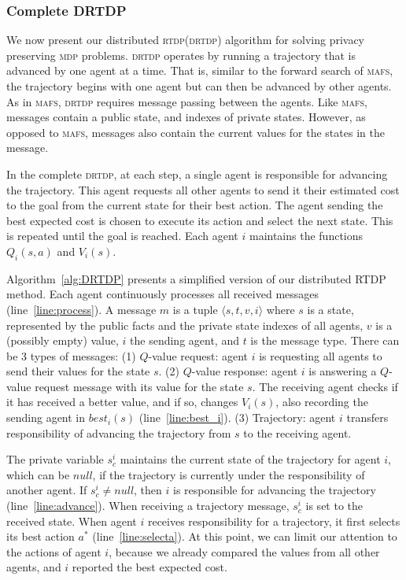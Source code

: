 \documentclass[letterpaper]{article} %
\newcommand{\mafs}{\textsc {mafs}\xspace}
\newcommand{\rtdp}{\textsc {rtdp}\xspace}
\newcommand{\drtdp}{\textsc {drtdp}\xspace}
\newcommand{\mdp}{\textsc {mdp}\xspace}
\theoremstyle{remark}
\begin{document}
\subsubsection{Complete DRTDP}

We now present our distributed \rtdp (\drtdp) algorithm for solving privacy preserving \mdp problems. \drtdp operates by running a trajectory that is advanced by one agent at a time. That is, similar to the forward search of \mafs, the trajectory begins with one agent but can then be advanced by other agents. As in \mafs, \drtdp requires message passing between the agents. Like \mafs, messages contain a public state, and indexes of private states. However, as opposed to \mafs, messages also contain the current values for the states in the message.

In the complete \drtdp, at each step, a single agent is responsible for advancing the trajectory. This agent requests all other agents to send it their estimated cost to the goal from the current state for their best action. The agent sending the best expected cost is chosen to execute its action and select the next state. This is repeated until the goal is reached.
Each agent $i$ maintains the functions $Q_i(s,a)$ and $V_i(s)$.

Algorithm~\ref{alg:DRTDP} presents a simplified version of our distributed RTDP method. Each agent continuously processes all received messages (line~\ref{line:process}). A message $m$ is a tuple $\langle s, t, v, i \rangle$ where $s$ is a state, represented by the public facts and the private state indexes of all agents, $v$ is a (possibly empty) value, $i$ the sending agent, and $t$ is the message type.
There can be 3 types of messages:
(1) $Q$-value request: agent $i$ is requesting all agents to send their values for the state $s$.
(2) $Q$-value response: agent $i$ is answering a $Q$-value request message with its value for the state $s$. The receiving agent checks if it has received a better value, and if so, changes $V_i(s)$, also recording the sending agent in $best_i(s)$ (line~\ref{line:best_i}).
(3) Trajectory: agent $i$ transfers responsibility of advancing the trajectory from  $s$ to the receiving agent.

The private variable $s^i_c$ maintains the current state of the trajectory for agent $i$, which can be $null$, if the trajectory is currently under the responsibility of another agent. If $s^i_c \neq null$, then $i$ is responsible for advancing the trajectory (line~\ref{line:advance}). When receiving a trajectory message, $s^i_c$ is set to the received state.
When agent $i$ receives responsibility for a trajectory, it first selects its best action $a^*$ (line~\ref{line:selecta}). At this point, we can limit our attention to the actions of agent $i$, because we already compared the values from all other agents, and $i$ reported the best expected cost.
\end{document}
